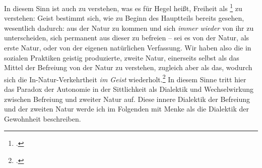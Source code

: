 \documentclass[12pt, a4paper, openany]{report}
\begin{document}
In diesem Sinn ist auch zu verstehen, was es für Hegel heißt, Freiheit als \footcite[][§194, S. 197.]{hegel_grundlinien_2017} zu verstehen: 
Geist bestimmt sich, wie zu Beginn des Hauptteils bereits gesehen, wesentlich dadurch: 
aus der Natur zu kommen und sich \emph{immer wieder} von ihr zu unterscheiden, sich permanent aus dieser zu befreien -- sei es von der Natur, als erste Natur, oder von der eigenen natürlichen Verfassung.
Wir haben also die in sozialen Praktiken geistig produzierte, zweite Natur, einerseits selbst als das Mittel der Befreiung von der Natur zu verstehen, zugleich aber als das, wodurch sich die In-Natur-Verkehrtheit \emph{im Geist} wiederholt.\footcite[Vgl.][41]{menke_autonomie_2018}
In diesem Sinne tritt hier das Paradox der Autonomie in der Sittlichkeit als Dialektik und Wechselwirkung zwischen Befreiung und zweiter Natur auf.
Diese innere Dialektik der Befreiung und der zweiten Natur werde ich im Folgenden mit Menke als die Dialektik der Gewohnheit beschreiben.
\end{document}
